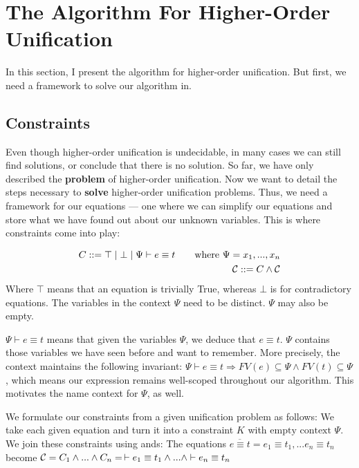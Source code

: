 \documentclass[twoside,12pt,a4paper]{article}
\begin{document}
\section{The Algorithm For Higher-Order Unification}\label{The Algorithm For Higher-Order Unification}
In this section, I present the algorithm for higher-order unification.
But first, we need a framework to solve our algorithm in.

\subsection{Constraints}

Even though higher-order unification is undecidable, in many cases we can still find solutions,
or conclude that there is no solution.
So far, we have only described the \textbf{problem} of higher-order unification. 
Now we want to detail the steps necessary to \textbf{solve} higher-order unification problems.
Thus, we need a framework for our equations --- one where we can simplify our equations
and store what we have found out about our unknown variables. This is where constraints come into play:

\begin{definition}[Constraint]
    \begin{align*}
        C ::= \top \;|\; \bot \;|\; \Psi \vdash e\equiv t \tag*{where $\Psi = x_1, ..., x_n$}\\
        \mathcal{C} ::= C \wedge \mathcal{C}
    \end{align*}
    Where $\top$ means that an equation is trivially True, whereas $\bot$ is for contradictory equations. 
    The variables in the context $\Psi$ need to be distinct. $\Psi$ may also be empty.
\end{definition}
$\Psi \vdash e\equiv t$ means that given the variables $\Psi$, we deduce that $e\equiv t$.
$\Psi$ contains those variables we have seen before and want to remember.
More precisely, the context maintains the following invariant:
$\Psi \vdash e\equiv t \Rightarrow FV(e)\subseteq \Psi \wedge FV(t)\subseteq \Psi$, %
which means our expression remains well-scoped throughout our algorithm.
This motivates the name context for $\Psi$, as well.

We formulate our constraints from a given unification problem as follows:
We take each given equation and turn it into a constraint $K$ with $\text{empty context }\Psi$. We join these constraints using ands:
The equations $\overline{e\equiv t}= e_1 \equiv t_1, ... e_n\equiv t_n$ become $\mathcal{C} = C_1 \wedge ... \wedge C_n = \, \vdash e_1 \equiv t_1 \wedge ...\wedge \vdash e_n \equiv t_n $  
\end{document}
